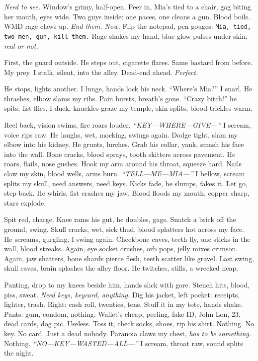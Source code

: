 \documentclass[12pt]{article}
\newcommand{\note}[1]{\texttt{#1}}
\begin{document}
{\textit{Need to see.} Window’s grimy, half-open. Peer in, \textnormal{Mia}’s tied to a chair, gag biting her mouth, eyes wide. Two guys inside: one paces, one cleans a gun. Blood boils. WMD rage claws up. \textit{End them. Now.} Flip the notepad, pen gouges: \note{Mia, tied, two men, gun, kill them.} Rage shakes my hand, blue glow pulses under skin, \textit{real or not.}

First, the guard outside. He steps out, cigarette flares. Same bastard from before. My prey. I stalk, silent, into the alley. Dead-end ahead. \textit{Perfect.}

He stops, lights another. I lunge, hands lock his neck. “Where’s \textnormal{Mia}?” I snarl. He thrashes, elbow slams my ribs. Pain bursts, breath’s gone. “Crazy bitch!” he spits, fist flies. I duck, knuckles graze my temple, skin splits, blood trickles warm.

Reel back, vision swims, fire roars louder. \textit{“KEY—WHERE—GIVE—”} I scream, voice rips raw. He laughs, wet, mocking, swings again. Dodge tight, slam my elbow into his kidney. He grunts, lurches. Grab his collar, yank, smash his face into the wall. Bone cracks, blood sprays, tooth skitters across pavement. He roars, flails, nose gushes. Hook my arm around his throat, squeeze hard. Nails claw my skin, blood wells, arms burn. \textit{“TELL—ME—MIA—”} I bellow, scream splits my skull, need answers, need keys. Kicks fade, he slumps, fakes it. Let go, step back. He whirls, fist crashes my jaw. Blood floods my mouth, copper sharp, stars explode.

Spit red, charge. Knee rams his gut, he doubles, gags. Snatch a brick off the ground, swing. Skull cracks, wet, sick thud, blood splatters hot across my face. He screams, gurgling, I swing again. Cheekbone caves, teeth fly, one sticks in the wall, blood streaks. Again, eye socket crushes, orb pops, jelly mixes crimson. Again, jaw shatters, bone shards pierce flesh, teeth scatter like gravel. Last swing, skull caves, brain splashes the alley floor. He twitches, stills, a wrecked heap.

Panting, drop to my knees beside him, hands slick with gore. Stench hits, blood, piss, sweat. \textit{Need keys, keycard, anything.} Dig his jacket, left pocket: receipts, lighter, trash. Right: cash roll, twenties, tens. Stuff it in my tote, hands shake. Pants: gum, condom, nothing. Wallet’s cheap, peeling, fake ID, \textnormal{John Lon}, 23, dead cards, dog pic. Useless. Toss it, check socks, shoes, rip his shirt. Nothing. No key. No card. Just a dead nobody. Paranoia claws my chest, \textit{has to be something.} Nothing. \textit{“NO—KEY—WASTED—ALL—”} I scream, throat raw, sound splits the night.

}
\end{document}
